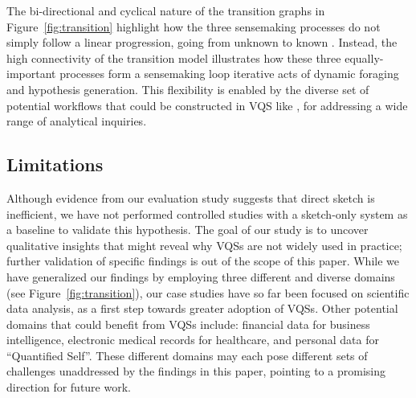 The bi-directional and cyclical nature
of the transition graphs in Figure~\ref{fig:transition} highlight how the three sensemaking processes do not simply follow a linear progression, going from unknown to known .%
 Instead, the high connectivity of the transition model illustrates how these three equally-important processes form a sensemaking loop iterative acts of dynamic foraging and hypothesis generation. This flexibility is enabled by the diverse set of potential workflows that could be constructed in  VQS like \zvpp, for addressing a wide range of analytical inquiries.%
\subsection{Limitations}
\par Although evidence from our evaluation study
suggests that direct sketch is inefficient,
we have not performed controlled studies
with a sketch-only system as a baseline to validate this hypothesis.
The goal of our study is to uncover qualitative insights
that might reveal why VQSs are not widely used in practice;
further validation of specific findings is out of the scope of this paper.
While we have generalized our findings by employing
three different and diverse domains (see Figure~\ref{fig:transition}),
our case studies have so far
been focused on scientific data analysis,
as a first step towards greater adoption of VQSs.
Other potential domains that could benefit from VQSs include:
financial data for business intelligence,
electronic medical records for healthcare,
and personal data for ``Quantified Self''.
These different domains may each pose different
 sets of challenges unaddressed
 by the findings in this paper,
 pointing to a promising direction for future work.
